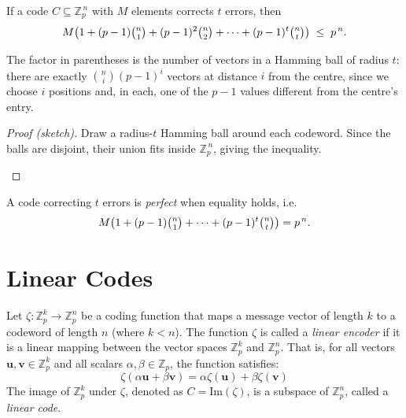 \documentclass[docmute]{article}
\begin{document}
\begin{theorem}
If a code $C\subseteq\mathbb Z_p^{\,n}$ with $M$ elements corrects $t$
errors, then
\[
  M\bigl(1 + (p-1)\tbinom{n}{1} + (p-1)^2\tbinom{n}{2}
        + \cdots + (p-1)^t\tbinom{n}{t}\bigr)\;\le\;p^{\,n}.
\]
\end{theorem}

\noindent The factor in parentheses is the number of vectors in a Hamming ball of
radius $t$: there are exactly $\binom{n}{i}(p-1)^i$ vectors at distance
$i$ from the centre, since we choose $i$ positions and, in each, one of
the $p-1$ values different from the centre's entry.

\begin{proof}[Proof (sketch)]
Draw a radius-$t$ Hamming ball around each codeword.
Since the balls are disjoint, their union fits inside
$\mathbb Z_p^{\,n}$, giving the inequality.

\begin{center}
\end{center}
\end{proof}

\begin{definition}
A code correcting $t$ errors is \emph{perfect} when equality holds, i.e.
\[
  M\bigl(1 + (p-1)\tbinom{n}{1} + \cdots + (p-1)^t\tbinom{n}{t}\bigr)=p^{\,n}.
\]
\end{definition}


\section{Linear Codes}
\begin{definition}
Let $\zeta: \mathbb{Z}_p^k \to \mathbb{Z}_p^n$ be a coding function that maps a message vector of length $k$ to a codeword of length $n$ (where $k < n$).
The function $\zeta$ is called a \emph{linear encoder} if it is a linear mapping between the vector spaces $\mathbb{Z}_p^k$ and $\mathbb{Z}_p^n$.
That is, for all vectors $\mathbf{u}, \mathbf{v} \in \mathbb{Z}_p^k$ and all scalars $\alpha, \beta \in \mathbb{Z}_p$, the function satisfies:
$$\zeta(\alpha \mathbf{u} + \beta \mathbf{v}) = \alpha \zeta(\mathbf{u}) + \beta \zeta(\mathbf{v})$$
The image of $\mathbb{Z}_p^k$ under $\zeta$, denoted as $C = \text{Im}(\zeta)$, is a subspace of $\mathbb{Z}_p^n$, called a \emph{linear code}.
\end{definition}
\end{document}

